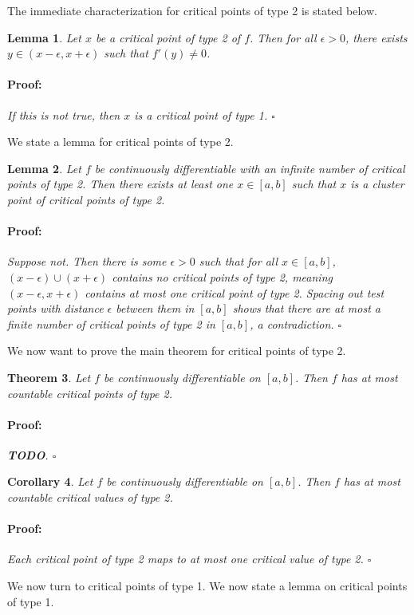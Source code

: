 \documentclass{article}
\newenvironment{proof}{\paragraph{Proof:}}{\hfill$\square$}
\newtheorem{theorem}{Theorem}
\newtheorem{lemma}[theorem]{Lemma}
\newtheorem{corollary}[theorem]{Corollary}
\begin{document}
The immediate characterization for critical points of type 2 is stated below.

\begin{lemma}
Let $x$ be a critical point of type 2 of $f$. Then for all $\epsilon > 0$, there exists $y \in (x-\epsilon, x + \epsilon)$ such that $f'(y) \neq 0$.
\begin{proof}
If this is not true, then $x$ is a critical point of type 1.
\end{proof} 
\end{lemma}

We state a lemma for critical points of type 2.

\begin{lemma}
Let $f$ be continuously differentiable with an infinite number of critical points of type 2. Then there exists at least one $x \in [a, b]$ such that $x$ is a cluster point of critical points of type 2. 
\begin{proof}
Suppose not. Then there is some $\epsilon > 0$ such that for all $x \in [a, b]$, $(x-\epsilon) \cup (x + \epsilon)$ contains no critical points of type 2, meaning $(x-\epsilon, x + \epsilon)$ contains at most one critical point of type 2. Spacing out test points with distance $\epsilon$ between them in $[a, b]$ shows that there are at most a finite number of critical points of type 2 in $[a, b]$, a contradiction.
\end{proof}
\end{lemma}

We now want to prove the main theorem for critical points of type 2.

\begin{theorem}
Let $f$ be continuously differentiable on $[a, b]$. Then $f$ has at most countable critical points of type 2.
\begin{proof}
\textbf{TODO}.
\end{proof}
\end{theorem}

\begin{corollary}
Let $f$ be continuously differentiable on $[a, b]$. Then $f$ has at most countable critical values of type 2.
\begin{proof}
Each critical point of type 2 maps to at most one critical value of type 2.
\end{proof}
\end{corollary}

We now turn to critical points of type 1. We now state a lemma on critical points of type 1.
\end{document}

